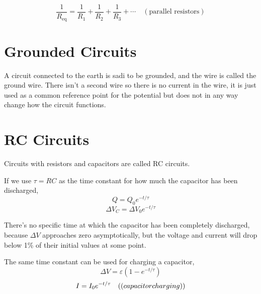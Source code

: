 \documentclass{article}
\begin{document}
\[\frac{1}{R_\text{eq}}=\frac{1}{R_1} + \frac{1}{R_2} + \frac{1}{R_3} + \cdots\quad (\text{parallel resistors})\]

\section*{Grounded Circuits}
A circuit connected to the earth is sadi to be grounded, and the wire is called the ground wire. There isn't a second wire so there is no current in the wire, it is just used as a common reference point for the potential but does not in any way change how the circuit functions.

\section*{RC Circuits}
Circuits with resistors and capacitors are called RC circuits.

If we use $\tau=RC$ as the time constant for how much the capacitor has been discharged,
\[Q=Q_0 e^{-t/\tau}\]
\[\Delta V_C=\Delta V_0 e^{-t/\tau}\]

There's no specific time at which the capacitor has been completely discharged, because $\Delta V$ approaches zero asymptotically, but the voltage and current will drop below 1\% of their initial values at some point.

\vspace{1em}

The same time constant can be used for charging a capacitor,
\[\Delta V=\varepsilon(1-e^{-t/\tau})\]
\[I=I_0 e^{-t/\tau}\quad\text((capacitor charging))\]
\end{document}
